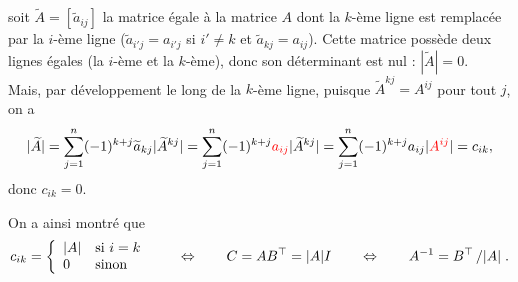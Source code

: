 \begin{description}
  soit $\widetilde{A} = [\widetilde{a}_{ij}]$ la matrice égale à la matrice $A$ dont la $k$-ème ligne est remplacée par la $i$-ème ligne ($\widetilde{a}_{i'j} = a_{i'j}$ si $i' \neq k$ et $\widetilde{a}_{kj} = a_{ij}$). Cette matrice possède deux lignes égales (la $i$-ème et la $k$-ème), donc son déterminant est nul : $|\widetilde{A}| = 0$. \\
  Mais, par développement le long de la $k$-ème ligne, puisque $\widetilde{A}^{kj}= A^{ij}$ pour tout $j$, on a
  $$
  |\widetilde{A}|
  = \sum_{j=1}^n (-1)^{k+j} \widetilde{a}_{kj} |\widetilde{A}^{kj}|
  = \sum_{j=1}^n (-1)^{k+j} \textcolor{red}{a_{ij}} |\widetilde{A}^{kj}|
  = \sum_{j=1}^n (-1)^{k+j} a_{ij} |\textcolor{red}{A^{ij}}|
  = c_{ik}, 
  $$
  donc $c_{ik} = 0$.
\end{description}
On a ainsi montré que
$$
c_{ik} = \left\{\begin{array}{ll} 
                  |A| & \text{si $i = k$} \\
                  0 & \text{sinon}
                \end{array} \right.
\qquad \Leftrightarrow \qquad
C = AB^\top = |A| I
\qquad \Leftrightarrow \qquad
A^{-1} = B^\top \left/|A|\right..
$$
\eproof
